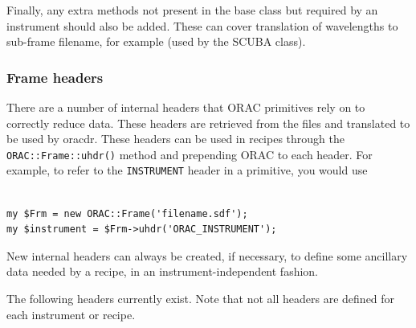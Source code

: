 \documentclass[twoside,11pt]{article}
\renewcommand{\_}{\texttt{\symbol{95}}}
\begin{document}
Finally, any extra methods not present in the base class but required
by an instrument should also be added. These can cover translation of
wavelengths to sub-frame filename, for example (used by the SCUBA class).

\subsubsection{Frame headers}

There are a number of internal headers that ORAC primitives rely on
to correctly reduce data. These headers are retrieved from the files
and translated to be used by oracdr. These headers can be used in 
recipes through the \texttt{ORAC::Frame::uhdr()} method and prepending 
ORAC\_ to each header. For example, to refer to the \texttt{INSTRUMENT}
header in a primitive, you would use

\begin{verbatim}

my $Frm = new ORAC::Frame('filename.sdf');
my $instrument = $Frm->uhdr('ORAC_INSTRUMENT');

\end{verbatim}

New internal headers can always be created, if necessary, to define
some ancillary data needed by a recipe, in an instrument-independent
fashion.

The following headers currently exist.  Note that not all headers are
defined for each instrument or recipe.
\end{document}
